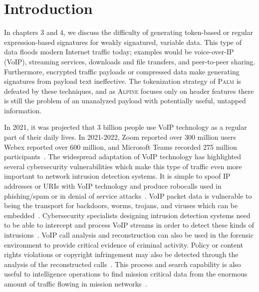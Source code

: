 \section{Introduction}

In chapters 3 and 4, we discuss the difficulty of generating token-based or regular expression-based signatures for weakly signatured, variable data. This type of data floods modern Internet traffic today; examples would be voice-over-IP (VoIP), streaming services, downloads and file transfers, and peer-to-peer sharing. Furthermore, encrypted traffic payloads or compressed data make generating signatures from payload text ineffective. The tokenization strategy of \textsc{Palm} is defeated by these techniques, and as \textsc{Alpine} focuses only on header features there is still the problem of an unanalyzed payload with potentially useful, untapped information.

In 2021, it was projected that 3 billion people use VoIP technology as a regular part of their daily lives. In 2021-2022, Zoom reported over 300 million users~\cite{teamstage} Webex reported over 600 million, and Microsoft Teams recorded 275 million participants~\cite{businessofapps}. The widespread adaptation of VoIP technology has highlighted several cybersecurity vulnerabilities which make this type of traffic even more important to network intrusion detection systems. It is simple to spoof IP addresses or URIs with VoIP technology and produce robocalls used in phishing/spam or in denial of service attacks~\cite{edwards2020robocalling}. VoIP packet data is vulnerable to being the transport for backdoors, worms, trojans, and viruses which can be embedded~\cite{Wu2021SteganographyAS, nagaraja2019voiploc}. Cybersecurity specialists designing intrusion detection systems need to be able to intercept and process VoIP streams in order to detect these kinds of intrusions~\cite{choti2021prediction}. VoIP call analysis and reconstruction can also be used in the forensic environment to provide critical evidence of criminal activity. Policy or content rights violations or copyright infringement may also be detected through the analysis of the reconstructed calls~\cite{kmetfast, Sha2016VoIPFA}. This process and search capability is also useful to intelligence operations to find mission critical data from the enormous amount of traffic flowing in mission networks~\cite{kao2020forensic}.

